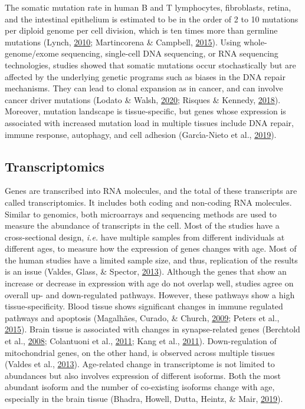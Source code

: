 \documentclass[12pt,twoside]{unicam}
\begin{document}
The somatic mutation rate in human B and T lymphocytes, fibroblasts, retina, and the intestinal epithelium is estimated to be in the order of 2 to 10 mutations per diploid genome per cell division, which is ten times more than germline mutations (Lynch, \protect\hyperlink{ref-Lynch2010}{2010}; Martincorena \& Campbell, \protect\hyperlink{ref-Martincorena2015}{2015}). Using whole-genome/exome sequencing, single-cell DNA sequencing, or RNA sequencing technologies, studies showed that somatic mutations occur stochastically but are affected by the underlying genetic programs such as biases in the DNA repair mechanisms. They can lead to clonal expansion as in cancer, and can involve cancer driver mutations (Lodato \& Walsh, \protect\hyperlink{ref-Lodato2020}{2020}; Risques \& Kennedy, \protect\hyperlink{ref-Risques2018}{2018}). Moreover, mutation landscape is tissue-specific, but genes whose expression is associated with increased mutation load in multiple tissues include DNA repair, immune response, autophagy, and cell adhesion (Garcı́a-Nieto et al., \protect\hyperlink{ref-Garcia-Nieto2019}{2019}).

\hypertarget{transcriptomics}{%
\subsection{Transcriptomics}\label{transcriptomics}}

Genes are transcribed into RNA molecules, and the total of these transcripts are called transcriptomics. It includes both coding and non-coding RNA molecules. Similar to genomics, both microarrays and sequencing methods are used to measure the abundance of transcripts in the cell. Most of the studies have a cross-sectional design, \emph{i.e.} have multiple samples from different individuals at different ages, to measure how the expression of genes changes with age. Most of the human studies have a limited sample size, and thus, replication of the results is an issue (Valdes, Glass, \& Spector, \protect\hyperlink{ref-Valdes2013}{2013}). Although the genes that show an increase or decrease in expression with age do not overlap well, studies agree on overall up- and down-regulated pathways. However, these pathways show a high tissue-specificity. Blood tissue shows significant changes in immune regulated pathways and apoptosis (Magalhães, Curado, \& Church, \protect\hyperlink{ref-deMagalhaes2009}{2009}; Peters et al., \protect\hyperlink{ref-Peters2015}{2015}). Brain tissue is associated with changes in synapse-related genes (Berchtold et al., \protect\hyperlink{ref-Berchtold2008}{2008}; Colantuoni et al., \protect\hyperlink{ref-Colantuoni2011}{2011}; Kang et al., \protect\hyperlink{ref-Kang2011}{2011}). Down-regulation of mitochondrial genes, on the other hand, is observed across multiple tissues (Valdes et al., \protect\hyperlink{ref-Valdes2013}{2013}). Age-related change in transcriptome is not limited to abundances but also involves expression of different isoforms. Both the most abundant isoform and the number of co-existing isoforms change with age, especially in the brain tissue (Bhadra, Howell, Dutta, Heintz, \& Mair, \protect\hyperlink{ref-Bhadra2019}{2019}).
\end{document}
